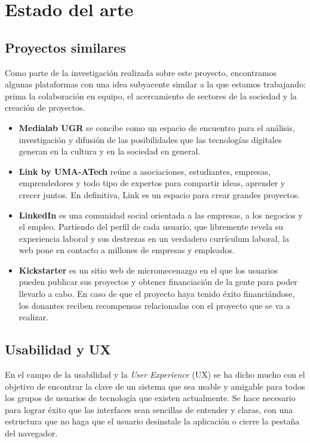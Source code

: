 \section{Estado del arte}
\subsection{Proyectos similares}
Como parte de la investigación realizada sobre este proyecto, encontramos algunas plataformas con una idea subyacente similar a la que estamos trabajando: prima la colaboración en equipo, el acercamiento de sectores de la sociedad y la creación de proyectos.

\begin{itemize}
    \item \textbf{Medialab UGR} \cite{medialabugr} se concibe como un espacio de encuentro para el análisis, investigación y difusión de las posibilidades que las tecnologías digitales generan en la cultura y en la sociedad en general.
    \item \textbf{Link by UMA-ATech} \cite{linkuma} reúne a asociaciones, estudiantes, empresas, emprendedores y todo tipo de expertos para compartir ideas, aprender y crecer juntos. En definitiva, Link es un espacio para crear grandes proyectos.
    \item \textbf{LinkedIn} \cite{linkedin} es una comunidad social orientada a las empresas, a los negocios y el empleo. Partiendo del perfil de cada usuario, que libremente revela su experiencia laboral y sus destrezas en un verdadero currículum laboral, la web pone en contacto a millones de empresas y empleados.
    \item \textbf{Kickstarter} \cite{kickstarter} es un sitio web de micromecenazgo en el que los usuarios pueden publicar sus proyectos y obtener financiación de la gente para poder llevarlo a cabo. En caso de que el proyecto haya tenido éxito financiándose, los donantes reciben recompensas relacionadas con el proyecto que se va a realizar.
\end{itemize}

\subsection{Usabilidad y UX}
En el campo de la usabilidad y la \textit{User Experience} (UX) se ha dicho mucho con el objetivo de encontrar la clave de un sistema que sea usable y amigable para todos los grupos de usuarios de tecnología que existen actualmente. Se hace necesario para lograr éxito que las interfaces sean sencillas de entender y claras, con una estructura que no haga que el usuario desinstale la aplicación o cierre la pestaña del navegador.\\


